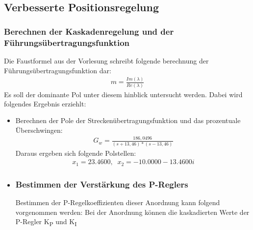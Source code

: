 \documentclass[10pt]{scrartcl}
\begin{document}
\subsection{Verbesserte Positionsregelung}
\subsubsection{Berechnen der Kaskadenregelung und der Führungsübertragungsfunktion}
Die Faustformel aus der Vorlesung schreibt folgende berechnung der Führungsübertragungsfunktion dar:
\begin{align}
   m=\frac{Im(\lambda)}{Re(\lambda)}
\end{align} 
Es soll der dominante Pol unter diesem hinblick untersucht werden. Dabei wird folgendes Ergebnis erziehlt:
\begin{itemize}
\item Berechnen der Pole der Streckenübertragungsfunktion und das prozentuale Überschwingen:
\begin{align}
G_{w} = \frac{186,0496}{(s+13,46) * (s-13,46)}
\end{align} 
Daraus ergeben sich folgende Polstellen:
\begin{align}
 x_1 = 23.4600 ,\,\,\
 x_2 =-10.0000 -13.4600i
\end{align}

\item \subsubsection{Bestimmen der Verstärkung des P-Reglers} Bestimmen der P-Regelkoeffizienten dieser Anordnung kann folgend vorgenommen werden:
Bei der Anordnung können die kaskadierten Werte der P-Regler K\textsubscript{P} und K\textsubscript{I} 


\end{itemize}
\end{document}
